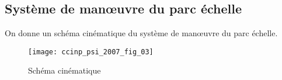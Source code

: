 
\subsection{Système de man\oe{}uvre du parc échelle}

 On donne un schéma cinématique du système de manœuvre du parc échelle.

\begin{figure}[H]
\centering
\texttt{[image: ccinp\_psi\_2007\_fig\_03]}
\caption{\label{ccinp_psi_2007_fig_03} Schéma cinématique}
\end{figure}





